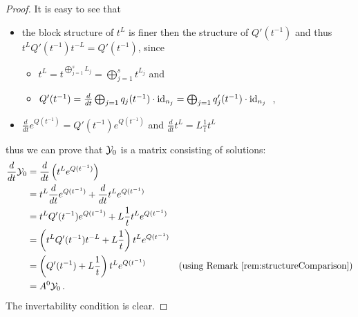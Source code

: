 \begin{proof}
  It is easy to see that
  \begin{itemize}
    \item the block structure of $t^L$ is finer then the structure of
      $Q'(t^{-1})$ and thus $t^LQ'(t^{-1})t^{-L}=Q'(t^{-1})$, since
      \begin{itemize}
        \item $t^L=t^{\bigoplus_{j=1}^sL_j}=\bigoplus_{j=1}^st^{L_j}$ and
        \item $Q'(t^{-1})=\frac{d}{dt}\bigoplus_{j=1}q_j(t^{-1})\cdot\operatorname{id}_{n_j}=
          \bigoplus_{j=1}q'_j(t^{-1})\cdot\operatorname{id}_{n_j}$ \,,
      \end{itemize}
    \item $\frac{d}{dt}e^{Q(t^{-1})}=Q'(t^{-1})e^{Q(t^{-1})}$ and
      $\frac{d}{dt}t^L=L\frac{1}{t}t^L$
  \end{itemize}
  thus we can prove that $\mathcal{Y}_0$ is a matrix consisting of solutions:
  \begin{align*}
    \frac{d}{dt}\mathcal{Y}_0
    &=\frac{d}{dt}\left(t^Le^{Q(t^{-1})}\right)
  \\&= t^L\frac{d}{dt}e^{Q(t^{-1})} + \frac{d}{dt}t^Le^{Q(t^{-1})}
  \\&= t^LQ'(t^{-1})e^{Q(t^{-1})} + L\frac{1}{t}t^Le^{Q(t^{-1})}
  \\&=\left(t^LQ'(t^{-1})t^{-L}+L\frac{1}{t}\right)t^Le^{Q(t^{-1})}
  \\&=\left(Q'(t^{-1})+L\frac{1}{t}\right)t^Le^{Q(t^{-1})}
    &\text{(using Remark~\ref{rem:structureComparison})}
  \\&=A^0\mathcal{Y}_0 \,.
  \end{align*}
  The invertability condition is clear.
\end{proof}
